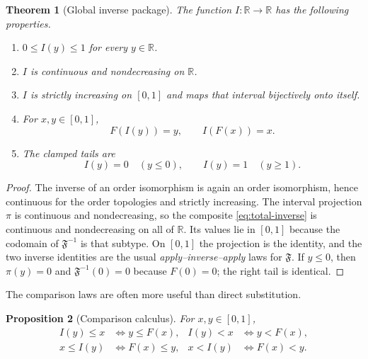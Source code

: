 \documentclass[11pt,oneside]{article}
\newtheorem{theorem}{Theorem}[section]
\newtheorem{proposition}[theorem]{Proposition}
\theoremstyle{definition}
\theoremstyle{remark}
\newcommand{\R}{\mathbb R}
\begin{document}
\begin{theorem}[Global inverse package]
\label{thm:global-inverse}
The function $I:\R\to\R$ has the following properties.
\begin{enumerate}
 \item $0\le I(y)\le1$ for every $y\in\R$.
 \item $I$ is continuous and nondecreasing on $\R$.
 \item $I$ is strictly increasing on $[0,1]$ and maps that interval bijectively onto itself.
 \item For $x,y\in[0,1]$,
 \begin{equation}
  F(I(y))=y,
  \qquad
  I(F(x))=x.
  \label{eq:two-sided-inverse}
 \end{equation}
 \item The clamped tails are
 \begin{equation}
  I(y)=0\quad(y\le0),
  \qquad
  I(y)=1\quad(y\ge1).
  \label{eq:inverse-tails}
 \end{equation}
\end{enumerate}
\end{theorem}

\begin{proof}
The inverse of an order isomorphism is again an order isomorphism, hence continuous for the
order topologies and strictly increasing.  The interval projection $\pi$ is continuous and
nondecreasing, so the composite \eqref{eq:total-inverse} is continuous and nondecreasing on
all of $\R$.  Its values lie in $[0,1]$ because the codomain of $\mathfrak F^{-1}$ is that
subtype.  On $[0,1]$ the projection is the identity, and the two inverse identities are the
usual \emph{apply--inverse--apply} laws for $\mathfrak F$.  If $y\le0$, then $\pi(y)=0$ and
$\mathfrak F^{-1}(0)=0$ because $F(0)=0$; the right tail is identical.
\end{proof}

The comparison laws are often more useful than direct substitution.

\begin{proposition}[Comparison calculus]
\label{prop:inverse-comparison}
For $x,y\in[0,1]$,
\begin{align}
 I(y)\le x &\iff y\le F(x),
 & I(y)<x &\iff y<F(x),                                    \label{eq:I-left-compare}\\
 x\le I(y) &\iff F(x)\le y,
 & x<I(y) &\iff F(x)<y.                                    \label{eq:I-right-compare}
\end{align}
\end{proposition}
\end{document}
